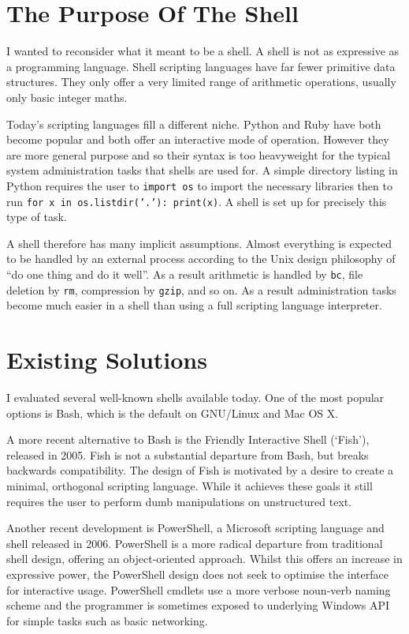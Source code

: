 \documentclass[12pt,twoside,notitlepage]{report}
\begin{document}
\section{The Purpose Of The Shell}
I wanted to reconsider what it meant to be a shell. A shell is not as
expressive as a programming language. Shell scripting languages have
far fewer primitive data structures. They only offer a very limited
range of arithmetic operations, usually only basic integer maths.

Today's scripting languages fill a different niche. Python and Ruby
have both become popular and both offer an interactive mode of
operation. However they are more general purpose and so their syntax
is too heavyweight for the typical system administration tasks that
shells are used for. A simple directory listing in Python requires the
user to {\tt import os} to import the necessary libraries then to run
{\tt for x in os.listdir('.'): print(x)}. A shell is set up for
precisely this type of task.

A shell therefore has many implicit assumptions. Almost everything is
expected to be handled by an external process according to the Unix
design philosophy of ``do one thing and do it well''. As a result
arithmetic is handled by {\tt bc}, file deletion by {\tt rm},
compression by {\tt gzip}, and so on. As a result administration tasks
become much easier in a shell than using a full scripting language
interpreter.

\section{Existing Solutions}
I evaluated several well-known shells available today. One of the most popular
options is Bash, which is the default on GNU/Linux and Mac OS X.

A more recent alternative to Bash is the Friendly Interactive Shell (`Fish'),
released in 2005. Fish is not a substantial departure from Bash, but breaks
backwards compatibility. The design of Fish \cite{fishdesign} is motivated by a
desire to create a minimal, orthogonal scripting language. While it achieves
these goals it still requires the user to perform dumb manipulations on
unstructured text.

Another recent development is PowerShell, a Microsoft scripting language and
shell released in 2006. PowerShell is a more radical departure from traditional
shell design, offering an object-oriented approach. Whilst this offers an
increase in expressive power, the PowerShell design does not seek to optimise
the interface for interactive usage. PowerShell cmdlets use a more verbose
noun-verb naming scheme and the programmer is sometimes exposed to underlying
Windows API for simple tasks such as basic networking.
\end{document}
